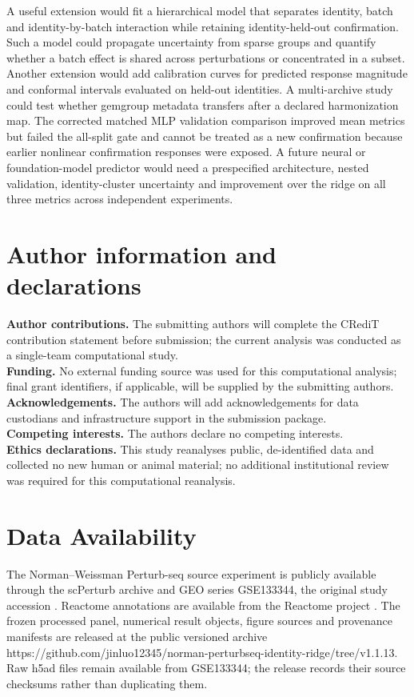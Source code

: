 \documentclass[10pt]{article}
\begin{document}
A useful extension would fit a hierarchical model that separates identity, batch and identity-by-batch interaction while retaining identity-held-out confirmation. Such a model could propagate uncertainty from sparse groups and quantify whether a batch effect is shared across perturbations or concentrated in a subset. Another extension would add calibration curves for predicted response magnitude and conformal intervals evaluated on held-out identities. A multi-archive study could test whether gemgroup metadata transfers after a declared harmonization map. The corrected matched MLP validation comparison improved mean metrics but failed the all-split gate and cannot be treated as a new confirmation because earlier nonlinear confirmation responses were exposed. A future neural or foundation-model predictor would need a prespecified architecture, nested validation, identity-cluster uncertainty and improvement over the ridge on all three metrics across independent experiments.

\section*{Author information and declarations}
\textbf{Author contributions.} The submitting authors will complete the CRediT contribution statement before submission; the current analysis was conducted as a single-team computational study.\\
\textbf{Funding.} No external funding source was used for this computational analysis; final grant identifiers, if applicable, will be supplied by the submitting authors.\\
\textbf{Acknowledgements.} The authors will add acknowledgements for data custodians and infrastructure support in the submission package.\\
\textbf{Competing interests.} The authors declare no competing interests.\\
\textbf{Ethics declarations.} This study reanalyses public, de-identified data and collected no new human or animal material; no additional institutional review was required for this computational reanalysis.

\section{Data Availability}
The Norman--Weissman Perturb-seq source experiment is publicly available through the scPerturb archive and GEO series GSE133344, the original study accession \citep{pmid31395745}. Reactome annotations are available from the Reactome project \citep{reactome2020}. The frozen processed panel, numerical result objects, figure sources and provenance manifests are released at the public versioned archive https://github.com/jinluo12345/norman-perturbseq-identity-ridge/tree/v1.1.13. Raw h5ad files remain available from GSE133344; the release records their source checksums rather than duplicating them.
\end{document}
